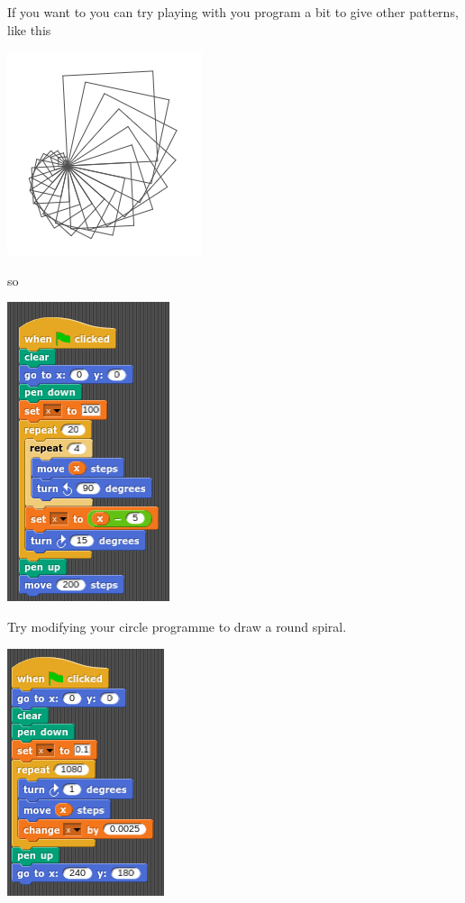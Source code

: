 \documentclass[11pt,a4paper]{scrartcl}
\begin{document}
If you want to you can try playing with you program a bit to give other patterns, like this
\begin{center}
\includegraphics{squares_spiral_pic.png}
\end{center}
so 
\begin{center}
\includegraphics{squares_spiral.png}
\end{center}
Try modifying your circle programme to draw a round spiral.
\begin{center}
\includegraphics{circle_spiral.png}
\end{center}
\end{document}
